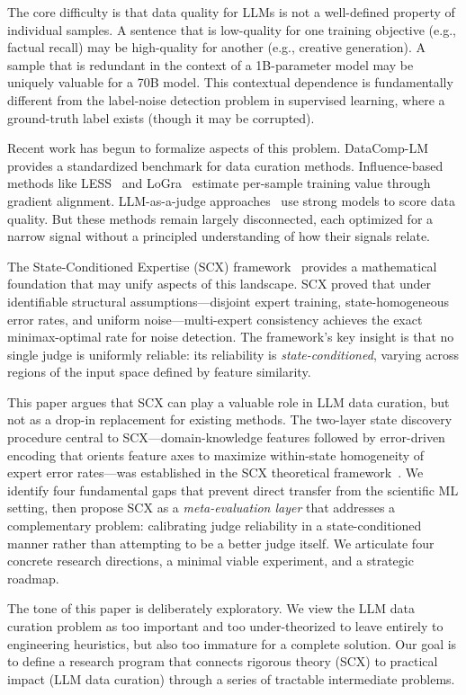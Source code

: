 \documentclass[11pt,twocolumn]{article}
\begin{document}
The core difficulty is that data quality for LLMs is not a well-defined property of individual samples. A sentence that is low-quality for one training objective (e.g., factual recall) may be high-quality for another (e.g., creative generation). A sample that is redundant in the context of a 1B-parameter model may be uniquely valuable for a 70B model. This contextual dependence is fundamentally different from the label-noise detection problem in supervised learning, where a ground-truth label exists (though it may be corrupted).

Recent work has begun to formalize aspects of this problem. DataComp-LM~\cite{li2024dclm} provides a standardized benchmark for data curation methods. Influence-based methods like LESS~\cite{xia2024less} and LoGra~\cite{choe2024loga} estimate per-sample training value through gradient alignment. LLM-as-a-judge approaches~\cite{zheng2024judging} use strong models to score data quality. But these methods remain largely disconnected, each optimized for a narrow signal without a principled understanding of how their signals relate.

The State-Conditioned Expertise (SCX) framework~\cite{scx2026} provides a mathematical foundation that may unify aspects of this landscape. SCX proved that under identifiable structural assumptions---disjoint expert training, state-homogeneous error rates, and uniform noise---multi-expert consistency achieves the exact minimax-optimal rate for noise detection. The framework's key insight is that no single judge is uniformly reliable: its reliability is \textit{state-conditioned}, varying across regions of the input space defined by feature similarity.

This paper argues that SCX can play a valuable role in LLM data curation, but not as a drop-in replacement for existing methods. The two-layer state discovery procedure central to SCX---domain-knowledge features followed by error-driven encoding that orients feature axes to maximize within-state homogeneity of expert error rates---was established in the SCX theoretical framework~\cite{scx2026}. We identify four fundamental gaps that prevent direct transfer from the scientific ML setting, then propose SCX as a \textit{meta-evaluation layer} that addresses a complementary problem: calibrating judge reliability in a state-conditioned manner rather than attempting to be a better judge itself. We articulate four concrete research directions, a minimal viable experiment, and a strategic roadmap.

The tone of this paper is deliberately exploratory. We view the LLM data curation problem as too important and too under-theorized to leave entirely to engineering heuristics, but also too immature for a complete solution. Our goal is to define a research program that connects rigorous theory (SCX) to practical impact (LLM data curation) through a series of tractable intermediate problems.
\end{document}
